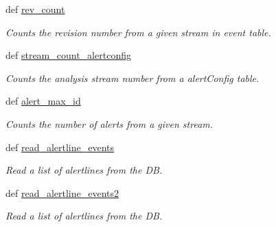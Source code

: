\begin{DoxyCompactItemize}
def \hyperlink{namespaceamonpy_1_1dbase_1_1db__read_ad56e9c199b78bc3ef94eb071f6a6c45c}{rev\-\_\-count}
\begin{DoxyCompactList}\small\item\em Counts the revision number from a given stream in event table. \end{DoxyCompactList}\item 
def \hyperlink{namespaceamonpy_1_1dbase_1_1db__read_a7650619e7c136d6b86feced068f6d334}{stream\-\_\-count\-\_\-alertconfig}
\begin{DoxyCompactList}\small\item\em Counts the analysis stream number from a alert\-Config table. \end{DoxyCompactList}\item 
def \hyperlink{namespaceamonpy_1_1dbase_1_1db__read_a5f1ab9e386d96bc73c7b491ddf65df7d}{alert\-\_\-max\-\_\-id}
\begin{DoxyCompactList}\small\item\em Counts the number of alerts from a given stream. \end{DoxyCompactList}\item 
def \hyperlink{namespaceamonpy_1_1dbase_1_1db__read_ab6d50b3187091c5a15d56d1ff1fd5c27}{read\-\_\-alertline\-\_\-events}
\begin{DoxyCompactList}\small\item\em Read a list of alertlines from the D\-B. \end{DoxyCompactList}\item 
def \hyperlink{namespaceamonpy_1_1dbase_1_1db__read_a88e3684dfe05de4b9245313e5c565b50}{read\-\_\-alertline\-\_\-events2}
\begin{DoxyCompactList}\small\item\em Read a list of alertlines from the D\-B. \end{DoxyCompactList}\end{DoxyCompactItemize}


